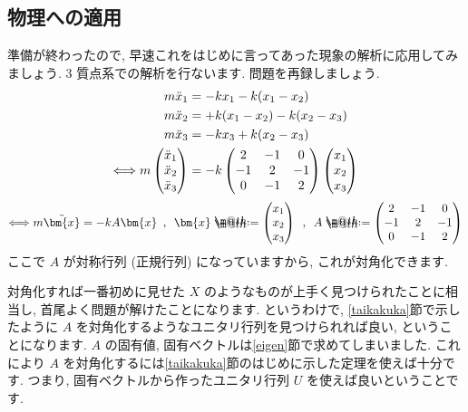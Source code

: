 \documentclass[openany, a4paper, oneside]{book}
\makeatletter
\newcommand*{\defeq}{\mathrel{\rlap{%
\raisebox{0.3ex}{$\m@th\cdot$}}%
\raisebox{-0.3ex}{$\m@th\cdot$}}%
=}
\theoremstyle{break}
\theoremstyle{breakdefn}
\makeatother
\begin{document}
\subsection{物理への適用}
\label{sec-4-3-2-9}

準備が終わったので, 早速これをはじめに言ってあった現象の解析に応用してみましょう.
3 質点系での解析を行ないます. 問題を再録しましょう.
    \begin{align}
        m\ddot{x}_{1} &= -kx_1 - k (x_1 - x_2 ) \notag \\
        m\ddot{x}_{2} &= + k (x_1 - x_2 ) - k (x_2 - x_3) \notag \\
        m\ddot{x}_{3} &= -kx_3 +k (x_2 - x_3 )  \notag \\
        \Longleftrightarrow
        m \begin{pmatrix} \ddot{x}_{1} \\ \ddot{x}_{2} \\ \ddot{x}_{3} \end{pmatrix}
        &= -k \begin{pmatrix} 2 & -1 & 0 \\ -1 & 2 & -1 \\ 0 & -1 & 2 \end{pmatrix}
        \begin{pmatrix} x_{1} \\ x_{2} \\ x_{3} \end{pmatrix} \notag
    \end{align}
    \begin{align}
        \Longleftrightarrow
        m \ddot{\bm{x}} = -k A \bm{x} \,\,\, , \,\,\,
        \bm{x} \defeq \begin{pmatrix} x_1 \\ x_2 \\ x_3 \end{pmatrix} \,\,\, , \,\,\,
        A \defeq \begin{pmatrix} 2 & -1 & 0 \\ -1 & 2 & -1 \\ 0 & -1 & 2 \end{pmatrix} \notag
    \end{align}
ここで $A$ が対称行列 (正規行列) になっていますから, これが対角化できます.

対角化すれば一番初めに見せた $X$ のようなものが上手く見つけられたことに相当し, 首尾よく問題が解けたことになります.
というわけで, \ref{taikakuka}節で示したように $A$ を対角化するようなユニタリ行列を見つけられれば良い, ということになります.
 $A$ の固有値, 固有ベクトルは\ref{eigen}節で求めてしまいました.
これにより $A$ を対角化するには\ref{taikakuka}節のはじめに示した定理を使えば十分です.
つまり, 固有ベクトルから作ったユニタリ行列 $U$ を使えば良いということです.
\end{document}
